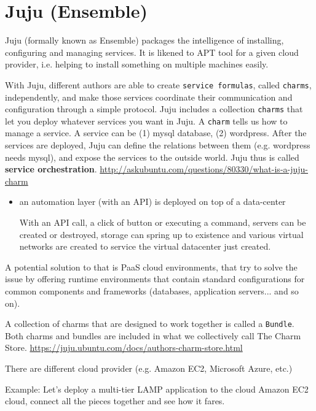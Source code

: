 \section{Juju (Ensemble)}
\label{sec:Juju}

Juju (formally known as Ensemble) packages the intelligence of installing,
configuring and managing services. It is likened to APT tool for a given cloud
provider, i.e. helping to install something on multiple machines easily. 

With Juju, different authors are able to create \verb!service formulas!, called
\verb!charms!, independently, and make those services coordinate their
communication and configuration through a simple protocol.
Juju includes a collection \verb!charms! that let you deploy whatever services
you want in Juju.  A \verb!charm! tells us how to manage a service. A service
can be (1) mysql database, (2) wordpress. After the services are deployed, Juju
can define the relations between them (e.g. wordpress needs mysql), and expose
the services to the outside world. 
Juju thus is called {\bf service orchestration}.
\url{http://askubuntu.com/questions/80330/what-is-a-juju-charm}

\begin{itemize}
  \item  an automation layer (with an API) is deployed on top of a data-center
  
  With an API call, a click of button or executing a command, servers can be
  created or destroyed, storage can spring up to existence and various virtual
  networks are created to service the virtual datacenter just created. 
  
  
\end{itemize}
A potential solution to that is PaaS cloud environments, that try to solve the
issue by offering runtime environments that contain standard configurations for
common components and frameworks (databases, application servers... and so on). 

A collection of charms that are designed to work together is called a
\verb!Bundle!. Both charms and bundles are included in what we collectively call
The Charm Store. \url{https://juju.ubuntu.com/docs/authors-charm-store.html}


There are different cloud provider (e.g. Amazon EC2, Microsoft Azure, etc.)


Example: Let's deploy a multi-tier LAMP application to the cloud  Amazon EC2
cloud, connect all the pieces together and see how it fares.

